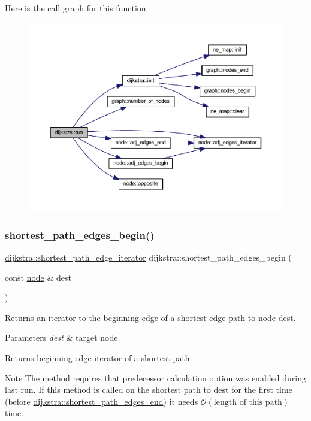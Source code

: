 Here is the call graph for this function\+:\nopagebreak
\begin{figure}[H]
\begin{center}
\leavevmode
\includegraphics[width=350pt]{classdijkstra_a7b30f3d8ad42baae27989bc14befe0d0_cgraph}
\end{center}
\end{figure}
\mbox{\label{classdijkstra_ad7ef6f747b68f8951322b265844dbb8a}} 
\subsubsection{\texorpdfstring{shortest\+\_\+path\+\_\+edges\+\_\+begin()}{shortest\_path\_edges\_begin()}}
{\footnotesize\ttfamily \mbox{\hyperlink{classdijkstra_afb9a918f95b13aefcef331896fe3b41c}{dijkstra\+::shortest\+\_\+path\+\_\+edge\+\_\+iterator}} dijkstra\+::shortest\+\_\+path\+\_\+edges\+\_\+begin (\begin{DoxyParamCaption}\item[{const \mbox{\hyperlink{classnode}{node}} \&}]{dest }\end{DoxyParamCaption})}



Returns an iterator to the beginning edge of a shortest edge path to node {\ttfamily dest}. 


\begin{DoxyParams}{Parameters}
{\em dest} & target node\\
\hline
\end{DoxyParams}
\begin{DoxyReturn}{Returns}
beginning edge iterator of a shortest path
\end{DoxyReturn}
\begin{DoxyNote}{Note}
The method requires that predecessor calculation option was enabled during last run. If this method is called on the shortest path to {\ttfamily dest} for the first time (before \mbox{\hyperlink{classdijkstra_a031e6fef10aa40aad10edc1053ad9cf0}{dijkstra\+::shortest\+\_\+path\+\_\+edges\+\_\+end}}) it needs $\mathcal{O}(\mbox{length of this path})$ time. 
\end{DoxyNote}


